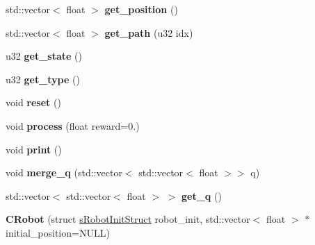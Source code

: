 \begin{DoxyCompactItemize}
\item 
\hypertarget{classCRobot_aaaab0dfac5231472b5fdfafccbdeb793}{std\-::vector$<$ float $>$ {\bfseries get\-\_\-position} ()}\label{classCRobot_aaaab0dfac5231472b5fdfafccbdeb793}

\item 
\hypertarget{classCRobot_a4bcb1bb8178861f4fb50085c0e1db6a5}{std\-::vector$<$ float $>$ {\bfseries get\-\_\-path} (u32 idx)}\label{classCRobot_a4bcb1bb8178861f4fb50085c0e1db6a5}

\item 
\hypertarget{classCRobot_ab3138c98ec513c8ba8b62ca256dc218b}{u32 {\bfseries get\-\_\-state} ()}\label{classCRobot_ab3138c98ec513c8ba8b62ca256dc218b}

\item 
\hypertarget{classCRobot_a5a2be51a9dfc1dcab5de73f087c02690}{u32 {\bfseries get\-\_\-type} ()}\label{classCRobot_a5a2be51a9dfc1dcab5de73f087c02690}

\item 
\hypertarget{classCRobot_aa0aa968c882047df76e98d8fa2f716b5}{void {\bfseries reset} ()}\label{classCRobot_aa0aa968c882047df76e98d8fa2f716b5}

\item 
\hypertarget{classCRobot_a4fa4dc67f0a8c28ed447e5158675aa53}{void {\bfseries process} (float reward=0.)}\label{classCRobot_a4fa4dc67f0a8c28ed447e5158675aa53}

\item 
\hypertarget{classCRobot_a926a6a0a461c1782198792f0e0a2b511}{void {\bfseries print} ()}\label{classCRobot_a926a6a0a461c1782198792f0e0a2b511}

\item 
\hypertarget{classCRobot_a3752dae34a5beeec8eb03ce0e6542763}{void {\bfseries merge\-\_\-q} (std\-::vector$<$ std\-::vector$<$ float $>$$>$ q)}\label{classCRobot_a3752dae34a5beeec8eb03ce0e6542763}

\item 
\hypertarget{classCRobot_a200f5bc4faa1c8c8572b5e8a097d4332}{std\-::vector$<$ std\-::vector$<$ float $>$ $>$ {\bfseries get\-\_\-q} ()}\label{classCRobot_a200f5bc4faa1c8c8572b5e8a097d4332}

\item 
\hypertarget{classCRobot_a41a1f01a5a62f3787602f34ce19bbdb0}{{\bfseries C\-Robot} (struct \hyperlink{structsRobotInitStruct}{s\-Robot\-Init\-Struct} robot\-\_\-init, std\-::vector$<$ float $>$ $\ast$initial\-\_\-position=N\-U\-L\-L)}\label{classCRobot_a41a1f01a5a62f3787602f34ce19bbdb0}


\end{DoxyCompactItemize}
